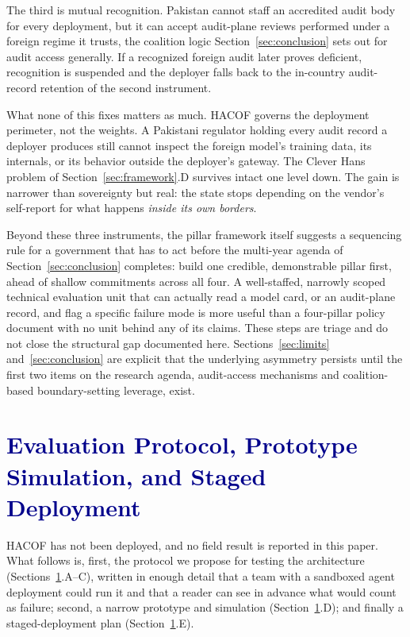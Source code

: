 \documentclass[journal]{IEEEtran}
\newcommand{\hacof}{HACOF}
\begin{document}
The third is mutual recognition. Pakistan cannot staff an accredited audit body for every deployment, but it can accept audit-plane reviews performed under a foreign regime it trusts, the coalition logic Section~\ref{sec:conclusion} sets out for audit access generally. If a recognized foreign audit later proves deficient, recognition is suspended and the deployer falls back to the in-country audit-record retention of the second instrument.

What none of this fixes matters as much. \hacof{} governs the deployment perimeter, not the weights. A Pakistani regulator holding every audit record a deployer produces still cannot inspect the foreign model's training data, its internals, or its behavior outside the deployer's gateway. The Clever Hans problem of Section~\ref{sec:framework}.D survives intact one level down. The gain is narrower than sovereignty but real: the state stops depending on the vendor's self-report for what happens \textit{inside its own borders}.

Beyond these three instruments, the pillar framework itself suggests a sequencing rule for a government that has to act before the multi-year agenda of Section~\ref{sec:conclusion} completes: build one credible, demonstrable pillar first, ahead of shallow commitments across all four. A well-staffed, narrowly scoped technical evaluation unit that can actually read a model card, or an audit-plane record, and flag a specific failure mode is more useful than a four-pillar policy document with no unit behind any of its claims. These steps are triage and do not close the structural gap documented here. Sections~\ref{sec:limits} and~\ref{sec:conclusion} are explicit that the underlying asymmetry persists until the first two items on the research agenda, audit-access mechanisms and coalition-based boundary-setting leverage, exist.

\section{\textcolor{darkblue}{Evaluation Protocol, Prototype Simulation, and Staged Deployment}}
\label{sec:eval}

\hacof{} has not been deployed, and no field result is reported in this paper. What follows is, first, the protocol we propose for testing the architecture (Sections~\ref{sec:eval}.A--C), written in enough detail that a team with a sandboxed agent deployment could run it and that a reader can see in advance what would count as failure; second, a narrow prototype and simulation (Section~\ref{sec:eval}.D); and finally a staged-deployment plan (Section~\ref{sec:eval}.E).
\end{document}
